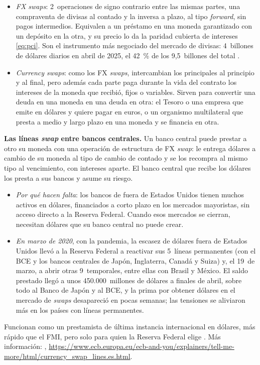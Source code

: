 \documentclass[11pt]{article}
\begin{document}
\begin{itemize}
\item \emph{FX swaps}: 2~operaciones de signo contrario entre las mismas partes, una compraventa de divisas al contado y la inversa a plazo, al tipo \emph{forward}, sin pagos intermedios. Equivalen a un préstamo en una moneda garantizado con un depósito en la otra, y su precio lo da la paridad cubierta de intereses \eqref{eq:pci}. Son el instrumento más negociado del mercado de divisas: 4~billones de dólares diarios en abril de 2025, el 42~\% de los 9,5~billones del total\nocite{BIS2025Trienal,HuangKrohnSushko2025FX} .
\item \emph{Currency swaps}: como los FX \emph{swaps}, intercambian los principales al principio y al final, pero además cada parte paga durante la vida del contrato los intereses de la moneda que recibió, fijos o variables. Sirven para convertir una deuda en una moneda en una deuda en otra: el Tesoro o una empresa que emite en dólares y quiere pagar en euros, o un organismo multilateral que presta a medio y largo plazo en una moneda y se financia en otra.
\end{itemize}

\begin{anotaciones}
\textbf{Las líneas \emph{swap} entre bancos centrales.} Un banco central puede prestar a otro su moneda con una operación de estructura de FX \emph{swap}: le entrega dólares a cambio de su moneda al tipo de cambio de contado y se los recompra al mismo tipo al vencimiento, con intereses aparte. El banco central que recibe los dólares los presta a sus bancos y asume su riesgo\nocite{GarciaEscuderoSanchez2020Swaps}.
\begin{itemize}
\item \emph{Por qué hacen falta}: los bancos de fuera de Estados Unidos tienen muchos activos en dólares, financiados a corto plazo en los mercados mayoristas, sin acceso directo a la Reserva Federal. Cuando esos mercados se cierran, necesitan dólares que su banco central no puede crear.
\item \emph{En marzo de 2020}, con la pandemia, la escasez de dólares fuera de Estados Unidos llevó a la Reserva Federal a reactivar sus 5~líneas permanentes (con el BCE y los bancos centrales de Japón, Inglaterra, Canadá y Suiza) y, el 19~de marzo, a abrir otras 9~temporales, entre ellas con Brasil y México\nocite{Fed2020Swaps}. El saldo prestado llegó a unos 450.000~millones de dólares a finales de abril, sobre todo al Banco de Japón y al BCE, y la prima por obtener dólares en el mercado de \emph{swaps} desapareció en pocas semanas\nocite{GarciaEscuderoSanchez2020Swaps}; las tensiones se aliviaron más en los países con líneas permanentes\nocite{ErenSchrimpfSushko2020Dollar}.
\end{itemize}
Funcionan como un prestamista de última instancia internacional en dólares, más rápido que el FMI, pero solo para quien la Reserva Federal elige  . Más información: \textcite{BCE2026LineasSwap}, \url{https://www.ecb.europa.eu/ecb-and-you/explainers/tell-me-more/html/currency_swap_lines.es.html}.
\end{anotaciones}
\end{document}
